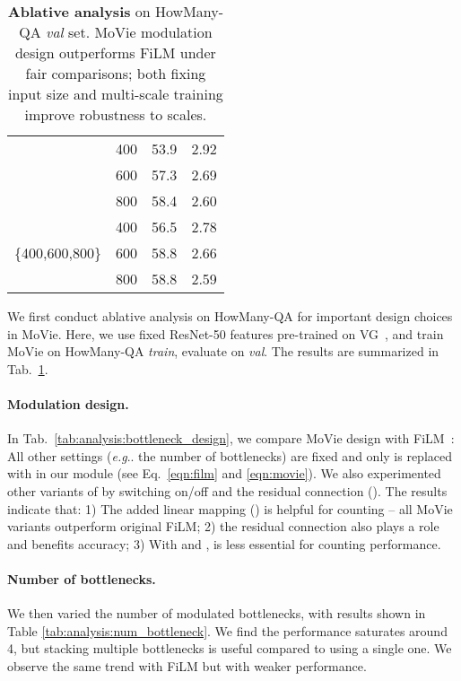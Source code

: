 \documentclass{article} \usepackage[dvipsnames,table]{xcolor}
\makeatletter
\newcommand{\ours}[0]{MoVie\xspace}
\DeclareRobustCommand\onedot{\futurelet\@let@token\@onedot}
\def\@onedot{\ifx\@let@token.\else.\null\fi\xspace}
\def\eg{\emph{e.g}\onedot} \def\Eg{\emph{E.g}\onedot}
\makeatother
\begin{document}
\begin{table}[t]
{\begin{tabular}{c|c|c|c}
\shline
\multirow{3}{*}{800} & 400 & 53.9 & 2.92 \\
& 600 & 57.3 & 2.69 \\
& 800 & 58.4 & 2.60 \\
\hline
\multirow{3}{*}{\{400,600,800\}} & 400 & 56.5 & 2.78 \\
& 600 & 58.8 & 2.66 \\
& 800 & 58.8 & 2.59 \\
\end{tabular}
}
\smallskip
\caption{\label{tab:analysis}\textbf{Ablative analysis} on HowMany-QA \emph{val} set. \ours modulation design outperforms FiLM under fair comparisons; both fixing input size and multi-scale training improve robustness to scales.}
\end{table}


We first conduct ablative analysis on HowMany-QA for important design choices in \ours. Here, we use fixed ResNet-50 features pre-trained on VG~\cite{jiang2020defense}, and train \ours on HowMany-QA \emph{train}, evaluate on \emph{val}. The results are summarized in Tab.~\ref{tab:analysis}.

\paragraph{Modulation design.} In Tab.~\ref{tab:analysis:bottleneck_design}, we compare \ours design with FiLM~\cite{perez2018film}: All other settings (\eg the number of bottlenecks) are fixed and only  is replaced with  in our module (see Eq.~\ref{eqn:film} and \ref{eqn:movie}). We also experimented other variants of  by switching on/off  and the residual connection (). The results indicate that: 1) The added linear mapping () is helpful for counting -- all \ours variants outperform original FiLM; 2) the residual connection also plays a role and benefits accuracy; 3) With  and ,  is less essential for counting performance. 

\paragraph{Number of bottlenecks.} We then varied the number of modulated bottlenecks, with results shown in Table \ref{tab:analysis:num_bottleneck}. We find the performance saturates around 4, but stacking multiple bottlenecks is useful compared to using a single one. We observe the same trend with FiLM but with weaker performance.
\end{document}
